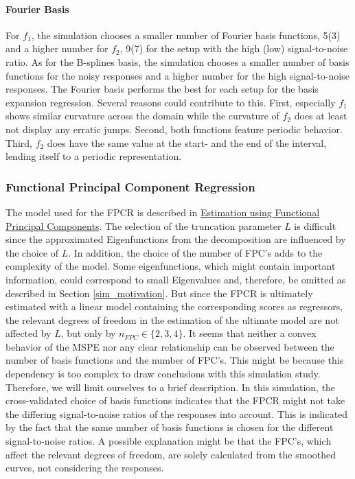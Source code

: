 \documentclass[11pt,twoside,a4paper]{article}
\begin{document}
	\paragraph{Fourier Basis}
	For $f_1$, the simulation chooses a smaller number of Fourier basis functions, 5(3) and a higher number for $f_2$, 9(7) for the setup with the high (low) signal-to-noise ratio. As for the B-splines basis, the simulation chooses a smaller number of basis functions for the noisy responses and a higher number for the high signal-to-noise responses. The Fourier basis performs the best for each setup for the basis expansion regression. Several reasons could contribute to this. First, especially $f_1$ shows similar curvature across the domain while the curvature of $f_2$ does at least not display any erratic jumps. Second, both functions feature periodic behavior. Third, $f_2$ does have the same value at the start- and the end of the interval, lending itself to a periodic representation.
	\vspace{-0.2cm}
	
	\subsubsection{Functional Principal Component Regression}
	The model used for the FPCR is described in \hyperref[fpc_exp_transf]{Estimation using Functional Principal Components}. The selection of the truncation parameter $L$ is difficult since the approximated Eigenfunctions from the decomposition are influenced by the choice of $L$. In addition, the choice of the number of FPC's adds to the complexity of the model. Some eigenfunctions, which might contain important information, could correspond to small Eigenvalues and, therefore, be omitted as described in Section \ref{sim_motivation}. But since the FPCR is ultimately estimated with a linear model containing the corresponding scores as regressors, the relevant degrees of freedom in the estimation of the ultimate model are not affected by $L$, but only by $n_{FPC} \in \{2, 3, 4 \}$. It seems that neither a convex behavior of the MSPE nor any clear relationship can be observed between the number of basis functions and the number of FPC's. This might be because this dependency is too complex to draw conclusions with this simulation study. Therefore, we will limit ourselves to a brief description. In this simulation, the cross-validated choice of basis functions indicates that the FPCR might not take the differing signal-to-noise ratios of the responses into account. This is indicated by the fact that the same number of basis functions is chosen for the different signal-to-noise ratios. A possible explanation might be that the FPC's, which affect the relevant degrees of freedom, are solely calculated from the smoothed curves, not considering the responses.
	
\end{document}
